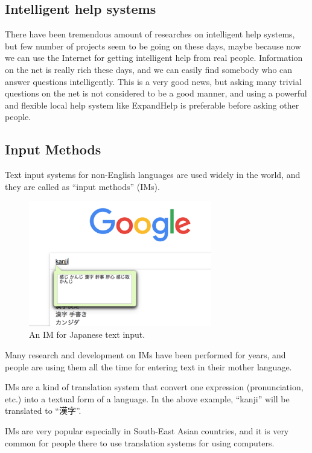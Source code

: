 \documentclass{sigchi}
\begin{document}
\subsection{Intelligent help systems}

There have been tremendous amount of researches on intelligent help systems\cite{Delisle:2002:UIH:606412.606415},
but few number of projects seem to be going on these days,
maybe because now we can use the Internet for getting intelligent help from
real people.
Information on the net is really rich these days, and we can easily
find somebody who can answer questions intelligently.
This is a very good news, but 
asking many trivial questions on the net is not considered to be a
good manner, and
using a powerful and flexible local help system like ExpandHelp is
preferable before asking other people.

\subsection{Input Methods}

Text input systems for non-English languages are used widely in the world, and
they are called as ``input methods'' (IMs).

\begin{figure}[h]
  \includegraphics[width=8cm,bb=0 0 976 670]{figures/nyuuryoku-ime.png}
  \caption{An IM for Japanese text input.}
  \label{bash1}
\end{figure}

Many research and development on IMs have been performed for years, and
people are using them all the time for entering text in their mother language.

IMs are a kind of translation system that convert one
expression (pronunciation, etc.) into a textual form of a language.
In the above example, ``kanji'' will be translated to ``漢字''.

IMs are very popular especially in South-East Asian countries, and
it is very common for people there to 
use translation systems for using computers.
\end{document}

